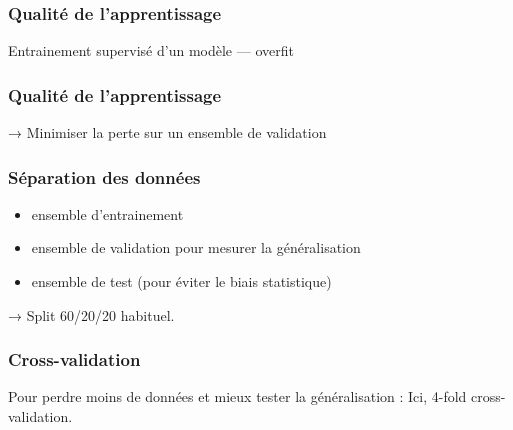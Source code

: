 \begin{frame}
  \frametitle{Qualité de l'apprentissage}
  Entrainement supervisé d'un modèle — overfit


\end{frame}

\begin{frame}
  \frametitle{Qualité de l'apprentissage}


  → Minimiser la perte sur un ensemble de validation
\end{frame}

\begin{frame}
  \frametitle{Séparation des données}
  \begin{itemize}
  \item ensemble d'entrainement
  \item ensemble de validation pour mesurer la généralisation
  \item ensemble de test (pour éviter le biais statistique)
  \end{itemize}
  → Split 60/20/20 habituel.
\end{frame}

\begin{frame}
  \frametitle{Cross-validation}
  Pour \og perdre\fg{} moins de données et mieux tester la
  généralisation :
  Ici, 4-fold cross-validation.
\end{frame}

